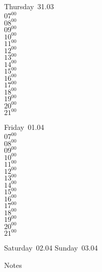 \documentclass[11pt,a4paper]{book}\usepackage[]{graphicx}\usepackage[]{color}
\begin{document}
\clearpage
\begin{headerbox}
\end{headerbox}
\begin{weekdaybox}
  Thursday~31.03\\
  { 
  \vfill
  $07^{00}$\\
$08^{00}$\\
$09^{00}$\\
$10^{00}$\\
$11^{00}$\\
$12^{00}$\\
$13^{00}$\\
$14^{00}$\\
$15^{00}$\\
$16^{00}$\\
$17^{00}$\\
$18^{00}$\\
$19^{00}$\\
$20^{00}$\\
$21^{00}$\\
  }
\end{weekdaybox} 
\begin{weekdaybox}
  Friday~01.04\\
  { 
  \vfill
  $07^{00}$\\
$08^{00}$\\
$09^{00}$\\
$10^{00}$\\
$11^{00}$\\
$12^{00}$\\
$13^{00}$\\
$14^{00}$\\
$15^{00}$\\
$16^{00}$\\
$17^{00}$\\
$18^{00}$\\
$19^{00}$\\
$20^{00}$\\
$21^{00}$\\
  }
\end{weekdaybox}
\begin{weekendbox}
  Saturday~02.04
  \tcblower
  Sunday~03.04
\end{weekendbox} %
\begin{notebox}
  Notes
\end{notebox}
\clearpage
\end{document}

